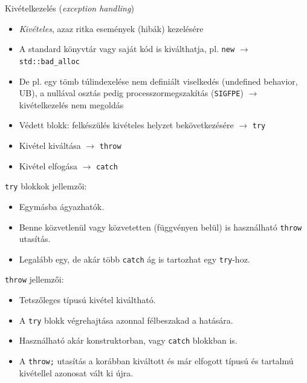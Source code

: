\documentclass[usenames,dvipsnames,aspectratio=169]{beamer}
\begin{document}
\begin{frame}
    Kivételkezelés (\emph{exception handling})
    \begin{itemize}
        \item \emph{Kivételes}, azaz ritka események (hibák) kezelésére
        \item A standard könyvtár vagy saját kód is kiválthatja, pl. \texttt{new} $\to$ \texttt{std::bad\_alloc} 
        \item De pl. egy tömb túlindexelése nem definiált viselkedés (undefined behavior, UB), a nullával osztás pedig processzormegszakítás (\texttt{SIGFPE}) $\to$ kivételkezelés nem megoldás
        \item Védett blokk: felkészülés kivételes helyzet bekövetkezésére $\to$ \texttt{try}
        \item Kivétel kiváltása $\to$ \texttt{throw}
        \item Kivétel elfogása $\to$ \texttt{catch}
    \end{itemize}
\end{frame}

\begin{frame}
    \texttt{try} blokkok jellemzői:
    \begin{itemize}
        \item Egymásba ágyazhatók.
        \item Benne közvetlenül vagy közvetetten (függvényen belül) is használható \texttt{throw} utasítás.
        \item Legalább egy, de akár több \texttt{catch} ág is tartozhat egy \texttt{try}-hoz.
    \end{itemize}
    \vfill
    \texttt{throw} jellemzői:
    \begin{itemize}
        \item Tetszőleges típusú kivétel kiváltható.
        \item A \texttt{try} blokk végrehajtása azonnal félbeszakad a hatására.
        \item Használható akár konstruktorban, vagy \texttt{catch} blokkban is.
        \item A \texttt{throw;} utasítás a korábban kiváltott és már elfogott típusú és tartalmú kivétellel azonosat vált ki újra.
    \end{itemize}
\end{frame}
\end{document}
